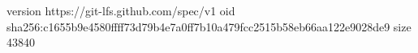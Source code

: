 version https://git-lfs.github.com/spec/v1
oid sha256:c1655b9e4580ffff73d79b4e7a0ff7b10a479fcc2515b58eb66aa122e9028de9
size 43840
